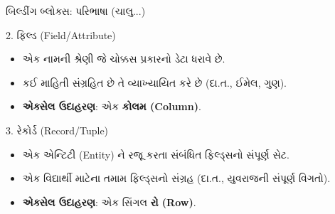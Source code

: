 \documentclass[aspectratio=169, 10pt]{beamer}
\begin{document}
\begin{frame}{બિલ્ડીંગ બ્લોક્સ: પરિભાષા (ચાલુ...)}
    \begin{block}{2. ફિલ્ડ (Field/Attribute)}
        \begin{itemize}
            \item એક નામની શ્રેણી જે ચોક્કસ પ્રકારનો ડેટા ધરાવે છે.
            \item કઈ માહિતી સંગ્રહિત છે તે વ્યાખ્યાયિત કરે છે (દા.ત., ઈમેલ, ગુણ).
            \item \textbf{એક્સેલ ઉદાહરણ}: એક \textbf{કોલમ (Column)}.
        \end{itemize}
    \end{block}
    \begin{block}{3. રેકોર્ડ (Record/Tuple)}
        \begin{itemize}
            \item એક એન્ટિટી (Entity) ને રજૂ કરતા સંબંધિત ફિલ્ડ્સનો સંપૂર્ણ સેટ.
            \item એક વિદ્યાર્થી માટેના તમામ ફિલ્ડ્સનો સંગ્રહ (દા.ત., યુવરાજની સંપૂર્ણ વિગતો).
            \item \textbf{એક્સેલ ઉદાહરણ}: એક સિંગલ \textbf{રો (Row)}.
        \end{itemize}
    \end{block}
\note{
}
\end{frame}
\end{document}
